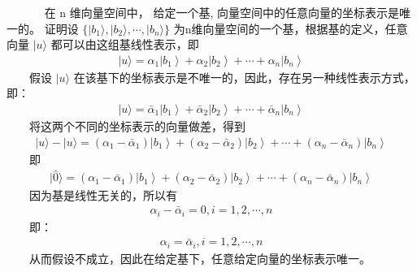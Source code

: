 \documentclass[a4paper,11pt,english]{sphinxmanual}
\begin{document}
\sphinxAtStartPar
​     在  \(\mathrm{n}\) 维向量空间中， 给定一个基, 向量空间中的任意向量的坐标表示是唯一的。 证明设  \(\{|b_{1}\rangle,|b_{2}\rangle, \cdots,|b_{n}\rangle\}\) 为n维向量空间的一个基，根据基的定义，任意向量  \(|u\rangle\) 都可以由这组基线性表示，即
\begin{equation*}
\begin{split}|u\rangle=\alpha_{1}\left|b_{1}\right\rangle+\alpha_{2}\left|b_{2}\right\rangle+\cdots+\alpha_{n}\left|b_{n}\right\rangle\end{split}
\end{equation*}
\sphinxAtStartPar
​  假设  \(| {u}\rangle\) 在该基下的坐标表示是不唯一的，因此，存在另一种线性表示方式，即：
\begin{equation*}
\begin{split}|u\rangle=\bar{\alpha}_{1}\left|b_{1}\right\rangle+\bar{\alpha}_{2}\left|b_{2}\right\rangle+\cdots+\bar{\alpha}_{n}\left|b_{n}\right\rangle\end{split}
\end{equation*}
\sphinxAtStartPar
​  将这两个不同的坐标表示的向量做差，得到
\begin{equation*}
\begin{split}|u\rangle-|u\rangle=\left(\alpha_{1}-\bar{\alpha}_{1}\right)\left|b_{1}\right\rangle+\left(\alpha_{2}-\bar{\alpha}_{2}\right)\left|b_{2}\right\rangle+\cdots+\left(\alpha_{n}-\bar{\alpha}_{n}\right)\left|b_{n}\right\rangle\end{split}
\end{equation*}
\sphinxAtStartPar
  即
\begin{equation*}
\begin{split}|\hat{0}\rangle=\left(\alpha_{1}-\bar{\alpha}_{1}\right)\left|b_{1}\right\rangle+\left(\alpha_{2}-\bar{\alpha}_{2}\right)\left|b_{2}\right\rangle+\cdots+\left(\alpha_{n}-\bar{\alpha}_{n}\right)\left|b_{n}\right\rangle\end{split}
\end{equation*}
\sphinxAtStartPar
​  因为基是线性无关的，所以有
\begin{equation*}
\begin{split}\alpha_{i}-\bar{\alpha}_{i}=0, i=1,2, \cdots, n\end{split}
\end{equation*}
\sphinxAtStartPar
​  即：
\begin{equation*}
\begin{split}\alpha_{i}=\bar{\alpha}_{i}, i=1,2, \cdots, n\end{split}
\end{equation*}
\sphinxAtStartPar
​  从而假设不成立，因此在给定基下，任意给定向量的坐标表示唯一。
\end{document}
